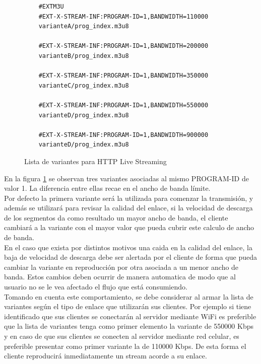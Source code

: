 \begin{figure}[H]
	\centering
	\begin{lstlisting}
	#EXTM3U
	#EXT-X-STREAM-INF:PROGRAM-ID=1,BANDWIDTH=110000
	varianteA/prog_index.m3u8
	
	#EXT-X-STREAM-INF:PROGRAM-ID=1,BANDWIDTH=200000
	varianteB/prog_index.m3u8

	#EXT-X-STREAM-INF:PROGRAM-ID=1,BANDWIDTH=350000
	varianteC/prog_index.m3u8

	#EXT-X-STREAM-INF:PROGRAM-ID=1,BANDWIDTH=550000
	varianteD/prog_index.m3u8

	#EXT-X-STREAM-INF:PROGRAM-ID=1,BANDWIDTH=900000
	varianteD/prog_index.m3u8

	\end{lstlisting}
	\caption{Lista de variantes para HTTP Live Streaming}
	\label{ejemploVariantPLS}	
\end{figure}	

En la figura \ref{ejemploVariantPLS} se observan tres variantes asociadas al mismo PROGRAM-ID de valor 1. La diferencia entre ellas recae en el ancho de banda límite.\\

Por defecto la primera variante será la utilizada para comenzar la transmisión, y además se utilizará para revisar la calidad del enlace, si la velocidad de descarga de los segmentos da como resultado un mayor ancho de banda, el cliente cambiará a la variante con el mayor valor que pueda cubrir este calculo de ancho de banda.\\

En el caso que exista por distintos motivos una caida en la calidad del enlace, la baja de velocidad de descarga debe ser alertada por el cliente de forma que pueda cambiar la variante en reproducción por otra asociada a un menor ancho de banda. Estos cambios deben ocurrir de manera automatica de modo que al usuario no se le vea afectado el flujo que está consumiendo.\\

Tomando en cuenta este comportamiento, se debe considerar al armar la lista de variantes según el tipo de enlace que utilizarán sus clientes. Por ejemplo si tiene identificado que sus clientes se conectarán al servidor mediante WiFi es preferible que la lista de variantes tenga como primer elemento la variante de 550000 Kbps y en caso de que sus clientes se conecten al servidor mediante red celular, es preferible presentar como primer variante la de 110000 Kbps.
	De esta forma el cliente reproducirá inmediatamente un stream acorde a su enlace. \\
	
